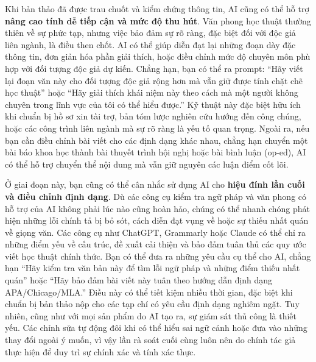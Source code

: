 Khi bản thảo đã được trau chuốt và kiểm chứng thông tin, AI cũng có thể hỗ trợ \textbf{nâng cao tính dễ tiếp cận và mức độ thu hút}. Văn phong học thuật thường thiên về sự phức tạp, nhưng việc bảo đảm sự rõ ràng, đặc biệt đối với độc giả liên ngành, là điều then chốt. AI có thể giúp diễn đạt lại những đoạn dày đặc thông tin, đơn giản hóa phần giải thích, hoặc điều chỉnh mức độ chuyên môn phù hợp với đối tượng độc giả dự kiến. Chẳng hạn, bạn có thể ra prompt: ``Hãy viết lại đoạn văn này cho đối tượng độc giả rộng hơn mà vẫn giữ được tính chặt chẽ học thuật'' hoặc ``Hãy giải thích khái niệm này theo cách mà một người không chuyên trong lĩnh vực của tôi có thể hiểu được.'' Kỹ thuật này đặc biệt hữu ích khi chuẩn bị hồ sơ xin tài trợ, bản tóm lược nghiên cứu hướng đến công chúng, hoặc các công trình liên ngành mà sự rõ ràng là yếu tố quan trọng. Ngoài ra, nếu bạn cần điều chỉnh bài viết cho các định dạng khác nhau, chẳng hạn chuyển một bài báo khoa học thành bài thuyết trình hội nghị hoặc bài bình luận (op-ed), AI có thể hỗ trợ chuyển thể nội dung mà vẫn giữ nguyên các luận điểm cốt lõi.

Ở giai đoạn này, bạn cũng có thể cân nhắc sử dụng AI cho \textbf{hiệu đính lần cuối và điều chỉnh định dạng}. Dù các công cụ kiểm tra ngữ pháp và văn phong có hỗ trợ của AI không phải lúc nào cũng hoàn hảo, chúng có thể nhanh chóng phát hiện những lỗi chính tả bị bỏ sót, cách diễn đạt vụng về hoặc sự thiếu nhất quán về giọng văn. Các công cụ như ChatGPT, Grammarly hoặc Claude có thể chỉ ra những điểm yếu về cấu trúc, đề xuất cải thiện và bảo đảm tuân thủ các quy ước viết học thuật chính thức. Bạn có thể đưa ra những yêu cầu cụ thể cho AI, chẳng hạn ``Hãy kiểm tra văn bản này để tìm lỗi ngữ pháp và những điểm thiếu nhất quán'' hoặc ``Hãy bảo đảm bài viết này tuân theo hướng dẫn định dạng APA/Chicago/MLA.'' Điều này có thể tiết kiệm nhiều thời gian, đặc biệt khi chuẩn bị bản thảo nộp cho các tạp chí có yêu cầu định dạng nghiêm ngặt. Tuy nhiên, cũng như với mọi sản phẩm do AI tạo ra, sự giám sát thủ công là thiết yếu. Các chỉnh sửa tự động đôi khi có thể hiểu sai ngữ cảnh hoặc đưa vào những thay đổi ngoài ý muốn, vì vậy lần rà soát cuối cùng luôn nên do chính tác giả thực hiện để duy trì sự chính xác và tính xác thực.

